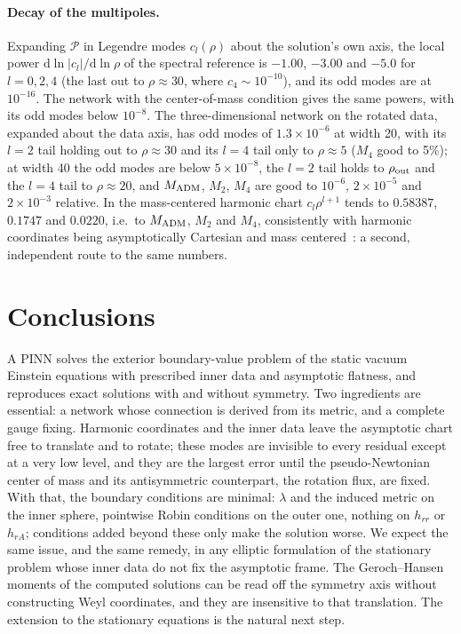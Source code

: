 \documentclass[aps,prd,twocolumn,superscriptaddress, nofootinbib,floatfix]{revtex4-2}
\newcommand{\dd}{\mathrm{d}}
\begin{document}
\paragraph{Decay of the multipoles.} Expanding $\mathcal P$ in Legendre modes $c_l(\rho)$ about the solution's own axis, the local power $\dd\ln|c_l|/\dd\ln\rho$ of the spectral reference is $-1.00$, $-3.00$ and $-5.0$ for $l=0,2,4$ (the last out to $\rho\approx30$, where $c_4\sim10^{-10}$), and its odd modes are at $10^{-16}$.
The network with the center-of-mass condition gives the same powers, with its odd modes below $10^{-8}$.
The three-dimensional network on the rotated data, expanded about the data axis, has odd modes of $1.3\times10^{-6}$ at width 20, with its $l=2$ tail holding out to $\rho\approx30$ and its $l=4$ tail only to $\rho\approx5$ ($M_4$ good to 5\%); at width 40 the odd modes are below $5\times10^{-8}$, the $l=2$ tail holds to $\rho_{\rm out}$ and the $l=4$ tail to $\rho\approx20$, and $M_{\rm ADM}$, $M_2$, $M_4$ are good to $10^{-6}$, $2\times10^{-5}$ and $2\times10^{-3}$ relative.
In the mass-centered harmonic chart $c_l\rho^{l+1}$ tends to $0.58387$, $0.1747$ and $0.0220$, i.e.\ to $M_{\rm ADM}$, $M_2$ and $M_4$, consistently with harmonic coordinates being asymptotically Cartesian and mass centered~\cite{Thorne1980,Gursel1983}: a second, independent route to the same numbers.

\section{Conclusions}\label{sec:conclusions}

A PINN solves the exterior boundary-value problem of the static vacuum Einstein equations with prescribed inner data and asymptotic flatness, and reproduces exact solutions with and without symmetry.
Two ingredients are essential: a network whose connection is derived from its metric, and a complete gauge fixing.
Harmonic coordinates and the inner data leave the asymptotic chart free to translate and to rotate; these modes are invisible to every residual except at a very low level, and they are the largest error until the pseudo-Newtonian center of mass and its antisymmetric counterpart, the rotation flux, are fixed.
With that, the boundary conditions are minimal: $\lambda$ and the induced metric on the inner sphere, pointwise Robin conditions on the outer one, nothing on $h_{rr}$ or $h_{rA}$; conditions added beyond these only make the solution worse.
We expect the same issue, and the same remedy, in any elliptic formulation of the stationary problem whose inner data do not fix the asymptotic frame.
The Geroch--Hansen moments of the computed solutions can be read off the symmetry axis without constructing Weyl coordinates, and they are insensitive to that translation.
The extension to the stationary equations is the natural next step.
\end{document}
